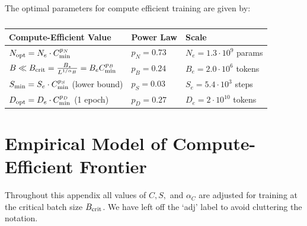 \documentclass[english]{article}
\begin{document}
The optimal parameters for compute efficient training are given by:

\begin{table}[h!]
\centering
\vspace{-0.5em}
\begin{tabular}{|l|l|l|}
\hline 
\textbf{Compute-Efficient Value} & \textbf{Power Law} & \textbf{Scale}\tabularnewline
\hline 
\hline 
$N_{{\rm opt}}=N_{e}\cdot C_{{\rm min}}^{p_{N}}$ & $p_{N}=0.73$ & $N_{e}=1.3\cdot10^{9}$ params\tabularnewline
\hline 
$B \ll B_{{\rm crit}}=\frac{B_{\ast}}{L^{1/\alpha_{B}}}=B_{e}C_{{\rm min}}^{p_{B}}$ & $p_{B}=0.24$ & $B_{e}=2.0\cdot10^{6}$ tokens\tabularnewline
\hline 
$S_{{\rm min}}=S_{e}\cdot C_{{\rm min}}^{p_{S}}$ (lower bound) & $p_{S}=0.03$ & $S_{e}=5.4\cdot10^{3}$ steps\tabularnewline
\hline 
$D_{{\rm opt}}=D_{e}\cdot C_{{\rm min}}^{p_{D}}$ (1 epoch) & $p_{D}=0.27$ & $D_{e}=2\cdot10^{10}$ tokens\tabularnewline
\hline 
\end{tabular}
\vspace{0.5em}
\caption[Trends for compute-efficient training]{}
\vspace{-1em}
\end{table}





\section{Empirical Model of Compute-Efficient Frontier}
\label{app:ComputeEfficientTraining}

Throughout this appendix all values of $C, S,$ and $\alpha_C$ are adjusted for training at the critical batch size $B_{\rm crit}$.  We have left off the `adj' label to avoid cluttering the notation. 
\end{document}
